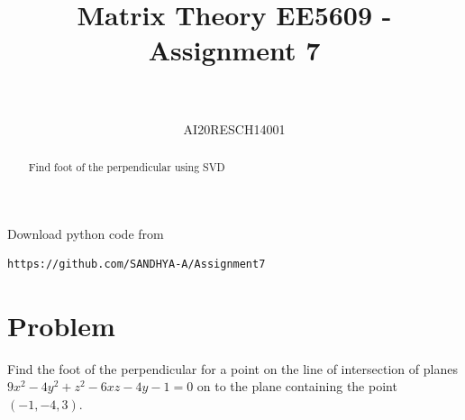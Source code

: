 \documentclass[journal,12pt,twocolumn]{IEEEtran}
\numberwithin{equation}{subsection}
\begin{document}
\title{Matrix Theory EE5609 - Assignment 7\\
}

\author{\\
 \\
AI20RESCH14001\\
 }

\maketitle
\begin{abstract}
Find foot of the perpendicular using SVD
\end{abstract}
Download  python code from 
\begin{lstlisting}
https://github.com/SANDHYA-A/Assignment7
\end{lstlisting}
\section{Problem}
Find the foot of the perpendicular for a point on the line of intersection of planes $9x^2 -4y^2 +z^2 -6xz -4y -1 =0$ on to the plane containing the point $(-1, -4 , 3)$.
\end{document}
